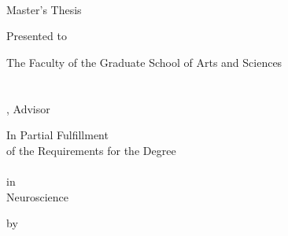 \begin{titlepage}
	\begin{center}
	    \large
	
	    \hfill
	
	    \vfill
	
	    \begingroup
	        \color{Maroon}\spacedallcaps{\myTitle} \\ \bigskip
	    \endgroup
	
	    \spacedlowsmallcaps{\mySubtitle}
	
	    \vfill
	    
	    Master's Thesis \\ \medskip
	    
	    Presented to \\ \medskip
	    
	    The Faculty of the Graduate School of Arts and Sciences \\
	    \myUni \\
	    \myDepartment \\
	    \myProf, Advisor \\ \medskip
	    
	    In Partial Fulfillment \\
	    of the Requirements for the Degree \\
	    \myDegree \\
	    in \\
	    Neuroscience \\ \medskip
	    
	    by \\
	    \myName \\
	
		\vfill
	    \myTime
	
	    \vfill
	
	\end{center}
\end{titlepage}
